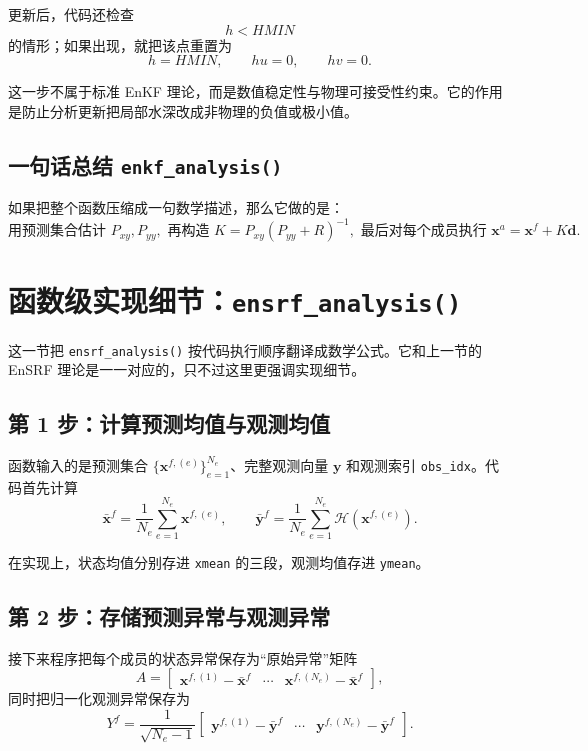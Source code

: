 \documentclass[12pt,a4paper]{article}
\begin{document}
更新后，代码还检查
\[
h < HMIN
\]
的情形；如果出现，就把该点重置为
\[
h=HMIN,\qquad hu=0,\qquad hv=0.
\]

这一步不属于标准 EnKF 理论，而是数值稳定性与物理可接受性约束。它的作用是防止分析更新把局部水深改成非物理的负值或极小值。

\subsection{一句话总结 \texttt{enkf\_analysis()}}

如果把整个函数压缩成一句数学描述，那么它做的是：
\[
\text{用预测集合估计 } P_{xy},P_{yy},
\text{ 再构造 } K=P_{xy}(P_{yy}+R)^{-1},
\text{ 最后对每个成员执行 } \mathbf{x}^a=\mathbf{x}^f+K\mathbf{d}.
\]

\section{函数级实现细节：\texttt{ensrf\_analysis()}}

这一节把 \texttt{ensrf\_analysis()} 按代码执行顺序翻译成数学公式。它和上一节的 EnSRF 理论是一一对应的，只不过这里更强调实现细节。

\subsection{第 1 步：计算预测均值与观测均值}

函数输入的是预测集合 $\{\mathbf{x}^{f,(e)}\}_{e=1}^{N_e}$、完整观测向量 $\mathbf{y}$ 和观测索引 \texttt{obs\_idx}。代码首先计算
\[
\bar{\mathbf{x}}^f
= \frac{1}{N_e}\sum_{e=1}^{N_e}\mathbf{x}^{f,(e)},
\qquad
\bar{\mathbf{y}}^f
= \frac{1}{N_e}\sum_{e=1}^{N_e}\mathcal{H}(\mathbf{x}^{f,(e)}).
\]

在实现上，状态均值分别存进 \texttt{xmean} 的三段，观测均值存进 \texttt{ymean}。

\subsection{第 2 步：存储预测异常与观测异常}

接下来程序把每个成员的状态异常保存为“原始异常”矩阵
\[
A
=
\begin{bmatrix}
\mathbf{x}^{f,(1)}-\bar{\mathbf{x}}^f &
\cdots &
\mathbf{x}^{f,(N_e)}-\bar{\mathbf{x}}^f
\end{bmatrix},
\]
同时把归一化观测异常保存为
\[
Y^f
= \frac{1}{\sqrt{N_e-1}}
\begin{bmatrix}
\mathbf{y}^{f,(1)}-\bar{\mathbf{y}}^f &
\cdots &
\mathbf{y}^{f,(N_e)}-\bar{\mathbf{y}}^f
\end{bmatrix}.
\]
\end{document}
